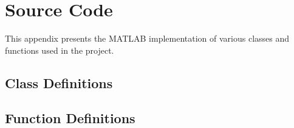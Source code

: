 \chapter{Source Code}
\label{chapter:appendix-source-code}

This appendix presents the MATLAB implementation of various classes and functions used in the project.


\section{Class Definitions}
\label{section:class-definitions}












\newpage
\section{Function Definitions}
\label{section:function-definitions}

